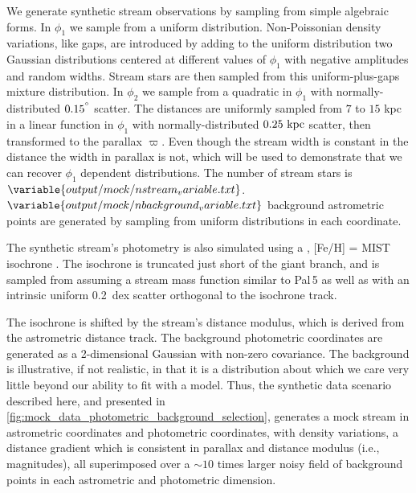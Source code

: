 \documentclass[twocolumn]{aastex631}
\newcommand{\stream}[1]{#1}
\newcommand{\parallax}{\varpi}
\begin{document}
        We generate synthetic stream observations by sampling from simple
        algebraic forms.  In $\phi_1$ we sample from a uniform distribution.
        Non-Poissonian density variations, like gaps, are introduced by adding
        to the uniform distribution two Gaussian distributions centered at
        different values of $\phi_1$ with negative amplitudes and random widths.
        Stream stars are then sampled from this uniform-plus-gaps mixture
        distribution.  In $\phi_2$ we sample from a quadratic in $\phi_1$ with
        normally-distributed $0.15^{\degree}$ scatter.  The distances are
        uniformly sampled from $7$ to $15$ kpc in a linear function in $\phi_1$
        with normally-distributed $0.25 \ \rm{kpc}$ scatter, then transformed to
        the parallax $\parallax$. Even though the stream width is constant in
        the distance the width in parallax is not, which will be used to
        demonstrate that we can recover $\phi_1$ dependent distributions.  The
        number of stream stars is $\variable{output/mock/nstream_variable.txt}$.
        $\variable{output/mock/nbackground_variable.txt}$ background astrometric
        points are generated by sampling from uniform distributions in each
        coordinate.
    
        The synthetic stream's photometry is also simulated using a
        \unskip, [Fe/H] =
         MIST isochrone
        \citep[using][]{brutus}. The isochrone is truncated just short of the
        giant branch, and is sampled from assuming a stream mass function
        similar to \stream{Pal\,5} \citep{GrillmairSmith2001} as well as with an
        intrinsic uniform 0.2~dex scatter orthogonal to the isochrone track.

        The isochrone is shifted by the stream's distance modulus, which is
        derived from the astrometric distance track.  The background photometric
        coordinates are generated as a 2-dimensional Gaussian with non-zero
        covariance. The background is illustrative, if not realistic, in that it
        is a distribution about which we care very little beyond our ability to
        fit with a model.  Thus, the synthetic data scenario described here, and
        presented in \autoref{fig:mock_data_photometric_background_selection},
        generates a mock stream in astrometric coordinates and photometric
        coordinates, with density variations, a distance gradient which is
        consistent in parallax and distance modulus (i.e., magnitudes), all
        superimposed over a $\sim 10$ times larger noisy field of background
        points in each astrometric and photometric dimension. 
\end{document}
